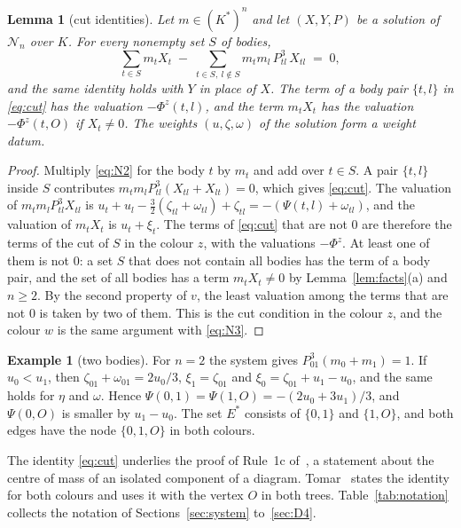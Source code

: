 \documentclass[11pt]{amsart}
\newtheorem{lemma}[theorem]{Lemma}
\theoremstyle{definition}
\newtheorem{example}[theorem]{Example}
\theoremstyle{remark}
\numberwithin{equation}{section}
\newcommand{\cN}{\mathcal{N}}
\newcommand{\Es}{E^{*}}
\begin{document}
\begin{lemma}[cut identities]\label{lem:A}
Let $m \in (K^{*})^n$ and let $(X, Y, P)$ be a solution of $\cN_n$ over $K$. For every nonempty set $S$
of bodies,
\begin{equation}\label{eq:cut}
  \sum_{t \in S} m_t X_t \;-\; \sum_{t \in S,\ l \notin S} m_t m_l\, P_{tl}^3\, X_{tl} \;=\; 0 ,
\end{equation}
and the same identity holds with $Y$ in place of $X$. The term of a body pair $\{t, l\}$ in
\eqref{eq:cut} has the valuation $-\Phi^z(t, l)$, and the term $m_t X_t$ has the valuation
$-\Phi^z(t, O)$ if $X_t \ne 0$. The weights $(u, \zeta, \omega)$ of the solution form a weight datum.
\end{lemma}

\begin{proof}
Multiply \eqref{eq:N2} for the body $t$ by $m_t$ and add over $t \in S$. A pair $\{t, l\}$ inside $S$
contributes $m_t m_l P_{tl}^3 (X_{tl} + X_{lt}) = 0$, which gives \eqref{eq:cut}. The valuation of
$m_t m_l P_{tl}^3 X_{tl}$ is
$u_t + u_l - \tfrac32 (\zeta_{tl} + \omega_{tl}) + \zeta_{tl} = -(\Psi(t, l) + \omega_{tl})$, and the
valuation of $m_t X_t$ is $u_t + \xi_t$. The terms of \eqref{eq:cut} that are not $0$ are therefore the
terms of the cut of $S$ in the colour $z$, with the valuations $-\Phi^z$. At least one of them is not
$0$: a set $S$ that does not contain all bodies has the term of a body pair, and the set of all bodies
has a term $m_t X_t \ne 0$ by Lemma~\ref{lem:facts}(a) and $n \ge 2$. By the second property of $v$, the
least valuation among the terms that are not $0$ is taken by two of them. This is the cut condition in
the colour $z$, and the colour $w$ is the same argument with \eqref{eq:N3}.
\end{proof}

\begin{example}[two bodies]\label{ex:n2}
For $n = 2$ the system gives $P_{01}^3 (m_0 + m_1) = 1$. If $u_0 < u_1$, then
$\zeta_{01} + \omega_{01} = 2u_0/3$, $\xi_1 = \zeta_{01}$ and $\xi_0 = \zeta_{01} + u_1 - u_0$, and the
same holds for $\eta$ and $\omega$. Hence $\Psi(0, 1) = \Psi(1, O) = -(2u_0 + 3u_1)/3$, and
$\Psi(0, O)$ is smaller by $u_1 - u_0$. The set $\Es$ consists of $\{0, 1\}$ and $\{1, O\}$, and both
edges have the node $\{0, 1, O\}$ in both colours.
\end{example}

The identity \eqref{eq:cut} underlies the proof of Rule~1c of~\cite[p.~546]{albouykaloshin2012}, a
statement about the centre of mass of an isolated component of a diagram.
Tomar~\cite[\S 2.3, \S 4.1 and \S 9.1]{tomar6} states the identity for both colours and uses it with the
vertex $O$ in both trees. Table~\ref{tab:notation} collects the notation of Sections~\ref{sec:system}
to~\ref{sec:D4}.
\end{document}
